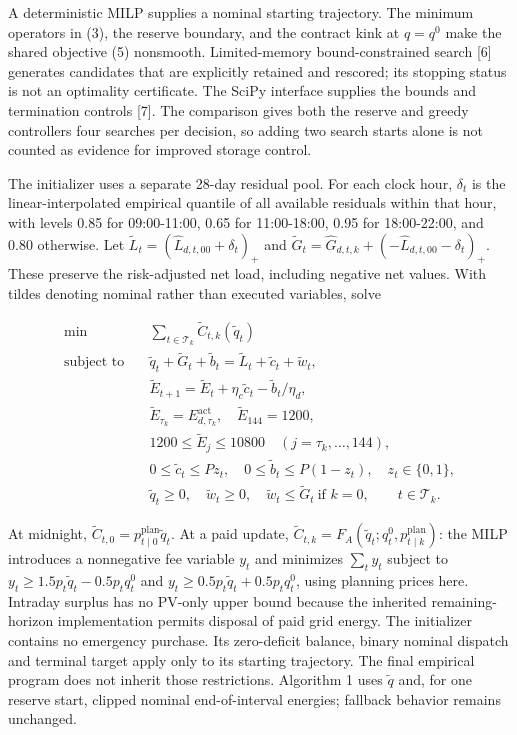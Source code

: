 A deterministic MILP supplies a nominal starting trajectory. The minimum operators in (3), the reserve boundary, and the contract kink at \(q=q^0\) make the shared objective (5) nonsmooth. Limited-memory bound-constrained search {[}6{]} generates candidates that are explicitly retained and rescored; its stopping status is not an optimality certificate. The SciPy interface supplies the bounds and termination controls {[}7{]}. The comparison gives both the reserve and greedy controllers four searches per decision, so adding two search starts alone is not counted as evidence for improved storage control.


The initializer uses a separate 28-day residual pool. For each clock hour, \(\delta_t\) is the linear-interpolated empirical quantile of all available residuals within that hour, with levels 0.85 for 09:00-11:00, 0.65 for 11:00-18:00, 0.95 for 18:00-22:00, and 0.80 otherwise. Let \(\widetilde L_t=(\widehat L_{d,t,00}+\delta_t)_+\) and \(\widetilde G_t=\widehat G_{d,t,k}+(-\widehat L_{d,t,00}-\delta_t)_+\). These preserve the risk-adjusted net load, including negative net values. With tildes denoting nominal rather than executed variables, solve

\[
\begin{aligned}
\min\quad&\sum_{t\in\mathcal T_k}\widetilde C_{t,k}(\widetilde q_t)\\
\text{subject to}\quad
 &\widetilde q_t+\widetilde G_t+\widetilde b_t=\widetilde L_t+\widetilde c_t+\widetilde w_t,\\
 &\widetilde E_{t+1}=\widetilde E_t+\eta_c\widetilde c_t-\widetilde b_t/\eta_d,\\
 &\widetilde E_{\tau_k}=E^{\mathrm{act}}_{d,\tau_k},\quad\widetilde E_{144}=1200,\\
 &1200\le\widetilde E_j\le10800\quad(j=\tau_k,\ldots,144),\\
 &0\le\widetilde c_t\le Pz_t,\quad0\le\widetilde b_t\le P(1-z_t),\quad z_t\in\{0,1\},\\
 &\widetilde q_t\ge0,\quad\widetilde w_t\ge0,\quad
 \widetilde w_t\le\widetilde G_t\ \text{if }k=0,\qquad t\in\mathcal T_k.
\end{aligned} \tag{8}
\]

At midnight, \(\widetilde C_{t,0}=p^{\mathrm{plan}}_{t\mid0}\widetilde q_t\). At a paid update, \(\widetilde C_{t,k}=F_A(\widetilde q_t;q_t^0,p^{\mathrm{plan}}_{t\mid k})\): the MILP introduces a nonnegative fee variable \(y_t\) and minimizes \(\sum_ty_t\) subject to \(y_t\ge1.5p_t\widetilde q_t-0.5p_tq_t^0\) and \(y_t\ge0.5p_t\widetilde q_t+0.5p_tq_t^0\), using planning prices here. Intraday surplus has no PV-only upper bound because the inherited remaining-horizon implementation permits disposal of paid grid energy. The initializer contains no emergency purchase. Its zero-deficit balance, binary nominal dispatch and terminal target apply only to its starting trajectory. The final empirical program does not inherit those restrictions. Algorithm 1 uses \(\widetilde q\) and, for one reserve start, clipped nominal end-of-interval energies; fallback behavior remains unchanged.

